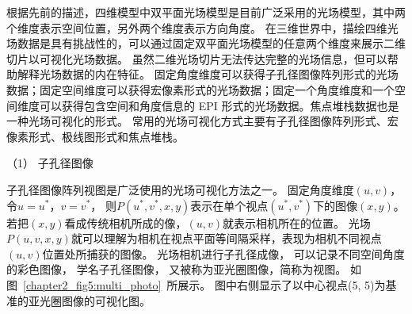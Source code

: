 
根据先前的描述，四维模型中双平面光场模型是目前广泛采用的光场模型，其中两个维度表示空间位置，另外两个维度表示方向角度。
在三维世界中，描绘四维光场数据是具有挑战性的，可以通过固定双平面光场模型的任意两个维度来展示二维切片以可视化光场数据。
虽然二维光场切片无法传达完整的光场信息，但可以帮助解释光场数据的内在特征。
固定角度维度可以获得子孔径图像阵列形式的光场数据；固定空间维度可以获得宏像素形式的光场数据；固定一个角度维度和一个空间维度可以获得包含空间和角度信息的 EPI 形式的光场数据。焦点堆栈数据也是一种光场可视化的形式。
常用的光场可视化方式主要有子孔径图像阵列形式、宏像素形式、极线图形式和焦点堆栈。








（1）
子孔径图像







子孔径图像阵列视图是广泛使用的光场可视化方法之一。
固定角度维度$(u, v)$，令$u = u^{*}$，$ v = v^{*} $，
则$P(u^{*}, v^{*}, x, y) $表示在单个视点$(u^{*}, v^{*})$下的图像$(x,y)$。
若把$(x,y)$看成传统相机所成的像，$(u, v)$就表示相机所在的位置。
光场$P(u, v, x, y)$就可以理解为相机在视点平面等间隔采样，表现为相机不同视点$(u, v)$位置处所捕获的图像。
光场相机进行子孔径成像，
可以记录不同空间角度的彩色图像，
学名子孔径图像，
又被称为亚光圈图像，简称为视图。
如图~\ref{chapter2_fig5:multi_photo}~所展示。
图中右侧显示了以中心视点(5, 5)为基准的亚光圈图像的可视化图。










